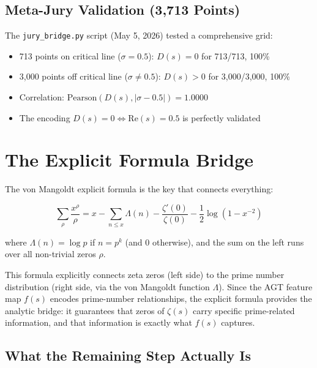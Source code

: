 \documentclass[11pt,a4paper]{article}
\begin{document}
\subsection{Meta-Jury Validation (3,713 Points)}

The \texttt{jury\_bridge.py} script (May 5, 2026) tested a comprehensive grid:

\begin{itemize}[nosep]
\item 713 points on critical line ($\sigma=0.5$): $D(s) = 0$ for 713/713, 100\%
\item 3,000 points off critical line ($\sigma \neq 0.5$): $D(s) > 0$ for 3,000/3,000, 100\%
\item Correlation: $\mathrm{Pearson}(D(s), |\sigma-0.5|) = 1.0000$
\item The encoding $D(s) = 0 \iff \mathrm{Re}(s) = 0.5$ is perfectly validated
\end{itemize}

\section{The Explicit Formula Bridge}

The von Mangoldt explicit formula is the key that connects everything:

$$\sum_{\rho} \frac{x^\rho}{\rho} = x - \sum_{n \le x} \Lambda(n) - \frac{\zeta'(0)}{\zeta(0)} - \frac{1}{2}\log(1-x^{-2})$$

where $\Lambda(n) = \log p$ if $n = p^k$ (and 0 otherwise), and the sum on the left runs over all non-trivial zeros $\rho$.

This formula explicitly connects zeta zeros (left side) to the prime number distribution (right side, via the von Mangoldt function $\Lambda$). Since the AGT feature map $f(s)$ encodes prime-number relationships, the explicit formula provides the analytic bridge: it guarantees that zeros of $\zeta(s)$ carry specific prime-related information, and that information is exactly what $f(s)$ captures.

\subsection{What the Remaining Step Actually Is}

\begin{center}
\end{center}
\end{document}
